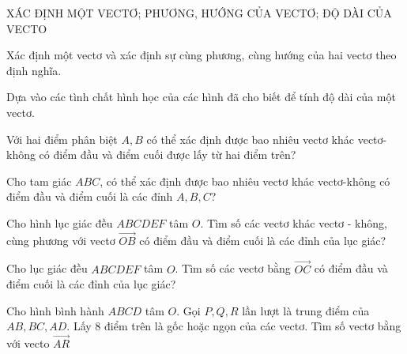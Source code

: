 \begin{dang}{XÁC ĐỊNH MỘT VECTƠ; PHƯƠNG, HƯỚNG CỦA VECTƠ; ĐỘ DÀI CỦA VECTO}
    \begin{pp}
        \item Xác định một vectơ và xác định sự cùng phương, cùng hướng của hai vectơ theo định nghĩa.
        \item Dựa vào các tình chất hình học của các hình đã cho biết để tính độ dài của một vectơ.
    \end{pp}

    \begin{vd}
        Với hai điểm phân biệt $A, B$ có thể xác định được bao nhiêu vectơ khác vectơ-không có điểm đầu và điểm cuối được lấy từ hai điểm trên?
    \end{vd}

    \begin{vd}
        Cho tam giác $ABC$, có thể xác định được bao nhiêu vectơ khác vectơ-không có điểm đầu và điểm cuối là các đỉnh $A, B, C$?
    \end{vd}

    \begin{vd}
        Cho hình lục giác đều $ABCDEF$ tâm $O$. Tìm số các vectơ khác vectơ - không, cùng phương với vectơ $\vec{OB}$ có điểm đầu và điểm cuối là các đỉnh của lục giác?
    \end{vd}

    \begin{vd}
        Cho lục giác đều $ABCDEF$ tâm $O$. Tìm số các vectơ bằng $\vec{OC}$ có điểm đầu và điểm cuối là các đỉnh của lục giác?
    \end{vd}

    \begin{vd}
        Cho hình bình hành $ABCD$ tâm $O$. Gọi $P, Q, R$ lần lượt là trung điểm của $AB, BC, AD$. Lấy $8$ điểm trên là gốc hoặc ngọn của các vectơ. Tìm số vectơ bằng với vecto $\vec{AR}$
    \end{vd}


\end{dang}

